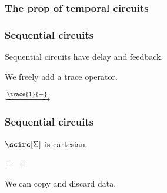 \begin{frame}
    \frametitle{The prop of temporal circuits}
    
    \begin{center}
    \end{center}

\end{frame}
\begin{frame}
    \frametitle{Sequential circuits}

    \pause

    Sequential circuits have delay and \alert{feedback}.
    
    \pause

    We freely add a \alert{trace operator}.

    \pause

    \begin{center}
        \quad$\xrightarrow{\trace{1}{-}}$\quad
    \end{center}        

    \pause

    \vspace{1.5em}

    \begin{center}
    \end{center}

\end{frame}
\begin{frame}
    \frametitle{Sequential circuits}

    \pause

    \begin{theorem}
        $\scirc[\Sigma]$ is cartesian.
    \end{theorem}
    \pause
    \begin{center}
        \pause
        \quad$=$\quad
        \quad\quad
        \pause
        \pause
        \quad$=$\quad
    \end{center}
    \pause
    We can \alert{copy} and \alert{discard} data.

\end{frame}

